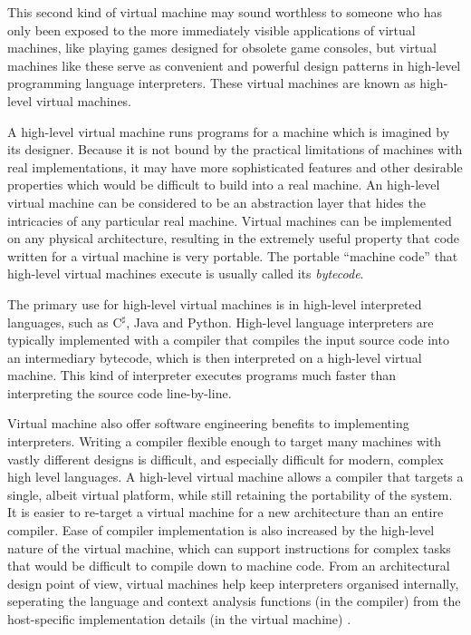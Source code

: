 		This second kind of virtual machine may sound worthless to someone who has only been exposed to the more immediately visible applications of virtual machines, like playing games designed for obsolete game consoles, but virtual machines like these serve as convenient and powerful design patterns in high-level programming language interpreters. These virtual machines are known as high-level virtual machines.
		
		A high-level virtual machine runs programs for a machine which is imagined by its designer. Because it is not bound by the practical limitations of machines with real implementations, it may have more sophisticated features and other desirable properties which would be difficult to build into a real machine. An high-level virtual machine can be considered to be an abstraction layer that hides the intricacies of any particular real machine. Virtual machines can be implemented on any physical architecture, resulting in the extremely useful property that code written for a virtual machine is very portable. The portable ``machine code'' that high-level virtual machines execute is usually called its \emph{bytecode}. 
		
		The primary use for high-level virtual machines is in high-level interpreted languages, such as C$^\sharp$, Java and Python. High-level language interpreters are typically implemented with a compiler that compiles the input source code into an intermediary bytecode, which is then interpreted on a high-level virtual machine. This kind of interpreter executes programs much faster than interpreting the source code line-by-line.
		
		Virtual machine also offer software engineering benefits to implementing interpreters. Writing a compiler flexible enough to target many machines with vastly different designs is difficult, and especially difficult for modern, complex high level languages. A high-level virtual machine allows a compiler that targets a single, albeit virtual platform, while still retaining the portability of the system. It is easier to re-target a virtual machine for a new architecture than an entire compiler. Ease of compiler implementation is also increased by the high-level nature of the virtual machine, which can support instructions for complex tasks that would be difficult to compile down to machine code. From an architectural design point of view, virtual machines help keep interpreters organised internally, seperating the language and context analysis functions (in the compiler) from the host-specific implementation details (in the virtual machine) \citep{structureinterpreters}.
		
